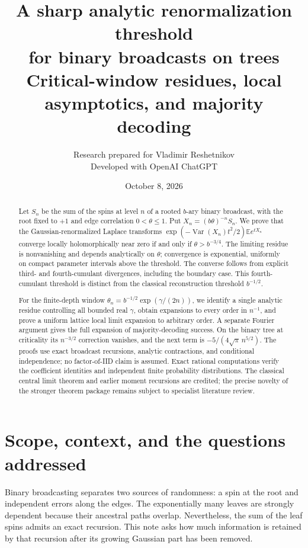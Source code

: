 \documentclass[11pt]{article}
\title{A sharp analytic renormalization threshold\texorpdfstring{\\}{ }for binary broadcasts on trees\texorpdfstring{\\[4pt]}{ }\large Critical-window residues, local asymptotics, and majority decoding}
\author{Research prepared for Vladimir Reshetnikov\\Developed with OpenAI ChatGPT}
\date{October 8, 2026}
\theoremstyle{definition}
\newcommand{\E}{\mathbb E}
\newcommand{\Var}{\operatorname{Var}}
\begin{document}
\maketitle
\begin{abstract}
Let $S_n$ be the sum of the spins at level $n$ of a rooted $b$-ary
binary broadcast, with the root fixed to $+1$ and edge correlation
$0<\theta\leq1$. Put $X_n=(b\theta)^{-n}S_n$. We prove that the
Gaussian-renormalized Laplace transforms
$\exp(-\Var(X_n)t^2/2)\E e^{tX_n}$ converge locally holomorphically
near zero if and only if $\theta>b^{-3/4}$. The limiting residue is
nonvanishing and depends analytically on $\theta$; convergence is
exponential, uniformly on compact parameter intervals above the threshold.
The converse follows from explicit third- and fourth-cumulant divergences,
including the boundary case. This fourth-cumulant threshold is distinct
from the classical reconstruction threshold $b^{-1/2}$.

For the finite-depth window
$\theta_n=b^{-1/2}\exp(\gamma/(2n))$, we identify a single analytic
residue controlling all bounded real $\gamma$, obtain expansions to
every order in $n^{-1}$, and prove a uniform lattice local limit expansion
to arbitrary order. A separate Fourier argument gives the full expansion
of majority-decoding success. On the binary tree at criticality its
$n^{-3/2}$ correction vanishes, and the next term is
$-5/(4\sqrt\pi\,n^{5/2})$. The proofs use exact broadcast recursions,
analytic contractions, and conditional independence; no factor-of-IID
claim is assumed. Exact rational computations verify the coefficient
identities and independent finite probability distributions. The classical
central limit theorem and earlier moment recursions are credited; the
precise novelty of the stronger theorem package remains subject to
specialist literature review.
\end{abstract}

\newpage
\tableofcontents
\newpage

\section{Scope, context, and the questions addressed}

Binary broadcasting separates two sources of randomness: a spin at the
root and independent errors along the edges. The exponentially many
leaves are strongly dependent because their ancestral paths overlap.
Nevertheless, the sum of the leaf spins admits an exact recursion.
This note asks how much information is retained by that recursion after
its growing Gaussian part has been removed.
\end{document}
